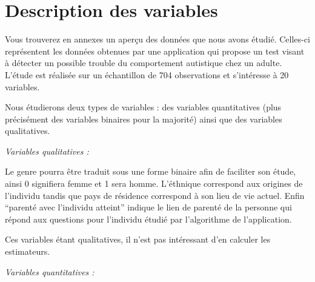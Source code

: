 \documentclass[12,french]{report}
\providecommand{\keywords}[1]{\textbf{\textit{Keywords:}} #1}
\begin{document}
\vspace{1cm}


\chapter{Description des variables}
Vous trouverez en annexes un aperçu des données que nous avons étudié. Celles-ci représentent les données obtenues par une application qui propose un test visant à détecter un possible trouble du comportement autistique chez un adulte. L’étude est réalisée sur un échantillon de 704 observations et s’intéresse à 20 variables. 

    Nous étudierons deux types de variables : des variables quantitatives (plus précisément des variables binaires pour la majorité) ainsi que des variables qualitatives.
    
\vspace{0.5cm}
\begin{center}
	\large\textit{Variables qualitatives :}
\end{center}
\vspace{0.2cm}

	Le genre pourra être traduit sous une forme binaire afin de faciliter son étude, ainsi 0 signifiera femme et 1 sera homme. L’éthnique correspond aux origines de l’individu tandis que pays de résidence correspond à son lieu de vie actuel. Enfin “parenté avec l’individu atteint” indique le lien de parenté de la personne qui répond aux questions pour l’individu étudié par l’algorithme de l’application.
	
    Ces variables étant qualitatives, il n’est pas intéressant d’en calculer les estimateurs.

\vspace{0.5cm}
\begin{center}
	\large\textit{Variables quantitatives :}
\end{center}
\vspace{0.2cm}
\end{document}
